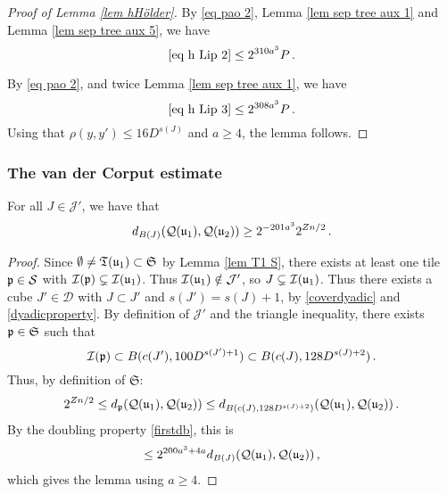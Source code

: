 {\begin{proof}[Proof of Lemma \ref{lem hHölder}]
        By \eqref{eq pao 2}, Lemma \ref{lem sep tree aux 1} and Lemma \ref{lem sep tree aux 5}, we have
        $$
            \eqref{eq h Lip 2} \le  2^{310a^3} P\,.
        $$

        By \eqref{eq pao 2}, and twice Lemma \ref{lem sep tree aux 1}, we have
        $$
            \eqref{eq h Lip 3} \le 2^{308a^3} P\,.
        $$
        Using that $\rho(y,y') \le 16D^{s(J)}$ and $a \ge 4$, the lemma follows.
    \end{proof}

\subsubsection{The van der Corput estimate}
\label{subsubsec van der corput}
    \begin{lemma}
        \label{lem osc lower bound}
        For all $J \in \mathcal{J}'$, we have that
        $$
            d_{B(J)}(\mathcal{Q}(\mathfrak u_1), \mathcal{Q}(\mathfrak u_2)) \ge 2^{-201a^3} 2^{Zn/2}\,.
        $$
    \end{lemma}

    \begin{proof}
    Since $\emptyset \ne \mathfrak T(\mathfrak u_1) \subset \mathfrak{S}$ by Lemma \ref{lem T1 S}, there exists at least one tile $\mathfrak p \in \mathcal{S}$ with $\mathcal{I}(\mathfrak p) \subsetneq \mathcal{I}(\mathfrak u_1)$. Thus $\mathcal{I}(\mathfrak u_1) \notin \mathcal{J}'$, so $J \subsetneq \mathcal{I}(\mathfrak u_1)$. Thus there exists a cube $J' \in \mathcal{D}$ with $J \subset J'$ and $s(J') = s(J) + 1$, by \eqref{coverdyadic} and \eqref{dyadicproperty}. By definition of $\mathcal{J'}$ and the triangle inequality, there exists $\mathfrak p \in \mathfrak{S}$ such that
    $$
        \mathcal{I}(\mathfrak p) \subset B(c(J'), 100 D^{s(J') + 1}) \subset B(c(J), 128 D^{s(J)+2})\,.
    $$
    Thus, by definition of $\mathfrak{S}$:
    \begin{align*}
        2^{Zn/2} \le d_{\mathfrak p}(\mathcal{Q}(\mathfrak u_1), \mathcal{Q}(\mathfrak u_2)) \le d_{B(c(J), 128 D^{s(J)+2})}(\mathcal{Q}(\mathfrak u_1), \mathcal{Q}(\mathfrak u_2))\,.
    \end{align*}
    By the doubling property \eqref{firstdb}, this is
    $$
        \le 2^{200a^3 + 4a} d_{B(J)}(\mathcal{Q}(\mathfrak u_1), \mathcal{Q}(\mathfrak u_2))\,,
    $$
    which gives the lemma using $a \ge 4$.
    \end{proof}

}
